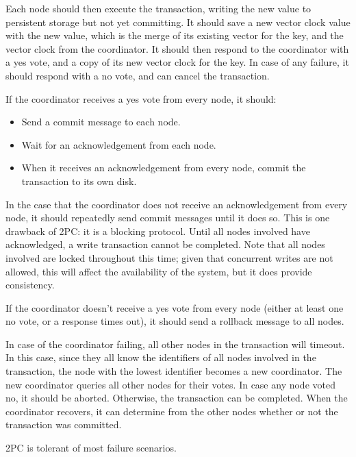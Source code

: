 \documentclass[12pt,a4paper]{article}
\begin{document}
Each node should then execute the transaction, writing the new value to persistent storage but not yet committing. It should save a new vector clock value with the new value, which is the merge of its existing vector for the key, and the vector clock from the coordinator. It should then respond to the coordinator with a yes vote, and a copy of its new vector clock for the key. In case of any failure, it should respond with a no vote, and can cancel the transaction.

If the coordinator receives a yes vote from every node, it should:

\begin{itemize}
  \item
  Send a commit message to each node.

  \item
  Wait for an acknowledgement from each node.

  \item
  When it receives an acknowledgement from every node, commit the transaction to its own disk.

\end{itemize}

In the case that the coordinator does not receive an acknowledgement from every node, it should repeatedly send commit messages until it does so. This is one drawback of 2PC: it is a blocking protocol. Until all nodes involved have acknowledged, a write transaction cannot be completed. Note that all nodes involved are locked throughout this time; given that concurrent writes are not allowed, this will affect the availability of the system, but it does provide consistency.

If the coordinator doesn't receive a yes vote from every node (either at least one no vote, or a response times out), it should send a rollback message to all nodes.

In case of the coordinator failing, all other nodes in the transaction will timeout. In this case, since they all know the identifiers of all nodes involved in the transaction, the node with the lowest identifier becomes a new coordinator. The new coordinator queries all other nodes for their votes. In case any node voted no, it should be aborted. Otherwise, the transaction can be completed. When the coordinator recovers, it can determine from the other nodes whether or not the transaction was committed.

2PC is tolerant of most failure scenarios.
\end{document}
